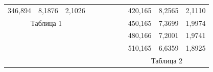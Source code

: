 \documentclass[a4paper,12pt]{article} %
\begin{document}
\begin{enumerate}
\begin{table}[h!]
\begin{tabular}{lllccllllll}
		\multicolumn{1}{|l|}{346,894} & \multicolumn{1}{l|}{8,1876}  & \multicolumn{1}{l|}{2,1026}   &                      &                      &  &  & \multicolumn{1}{l|}{} & \multicolumn{1}{l|}{420,165} & \multicolumn{1}{l|}{8,2565}  & \multicolumn{1}{l|}{2,1110}   \\ \cline{1-3} \cline{9-11} 
		\multicolumn{3}{c}{Таблица 1}                                                                &                      &                      &  &  & \multicolumn{1}{l|}{} & \multicolumn{1}{l|}{450,165} & \multicolumn{1}{l|}{7,3699}  & \multicolumn{1}{l|}{1,9974}   \\ \cline{9-11} 
		\multicolumn{1}{c}{}          & \multicolumn{1}{c}{}         & \multicolumn{1}{c}{}          &                      &                      &  &  & \multicolumn{1}{l|}{} & \multicolumn{1}{l|}{480,166} & \multicolumn{1}{l|}{7,2001}  & \multicolumn{1}{l|}{1,9741}   \\ \cline{9-11} 
		\multicolumn{1}{c}{}          & \multicolumn{1}{c}{}         & \multicolumn{1}{c}{}          &                      &                      &  &  & \multicolumn{1}{l|}{} & \multicolumn{1}{l|}{510,165} & \multicolumn{1}{l|}{6,6359}  & \multicolumn{1}{l|}{1,8925}   \\ \cline{9-11} 
		&                              &                               & \multicolumn{1}{l}{} & \multicolumn{1}{l}{} &  &  &                       & \multicolumn{3}{c}{Таблица 2}                                                              
	\end{tabular}
\end{table}
	
\newpage


\end{enumerate}
\end{document}
